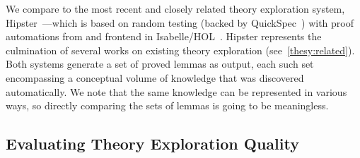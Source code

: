 \begin{comment} 
The better known but opposed approach is the common SMT solver approach (Barrett et al., Gil et al.). In the SMT approach, the solver attempts to search for a legal valuation, and assumptions are made freely. This leads to a cheap splitting mechanism, but with an expensive backtracking algorithm. We evaluated our case splitting mechanism by applying TheSy to Clam’s (Claessen et al.) theory-proving dataset with three configurations: no case splitting - default implementation; half case splitting – splitting was applied only during proof search; and full  case splitting – splitting was applied for both exploration and proof search. Each test case was limited to 15 minutes and 16 GB RAM, and the results are shown in Table 1. Additionally, we report the number of lemmas found in the full configuration compared to the half configuration and the number of proofs filtered in each configuration. An interesting point is that the no and full configurations had 53 and 54 goals proved, respectively. This difference is due to full configuration time-outing during case splitting in which regular exploration is sufficient. Using the half configuration, TheSy proved 61 goals which mostly overlap with the previous configurations as it is less prune to time-outs. In total, TheSy proved 63 out of the 85 goals. Memory and time limits lead to most of the full case splitting failures. Case splitting during exploration led to additional conjectures and lemmas; many conjectures were filtered only after proving their correctness, a phenomenon which impaired the conjecture generation/screening process. This happened because TheSy’s e-graph size is limited for memory concerns, resulting in an unsound screening process .
\end{comment}

We compare \TheSy to the most recent and closely related theory exploration system, Hipster~\cite{hipster}---which is
based on random testing (backed by QuickSpec~\cite{JFP2017:Smallbonequickspec2}) with proof automations from and frontend in Isabelle/HOL~\cite{Book2002:Nipkow}.
Hipster represents the culmination of several works on existing theory exploration (see~\autoref{thesy:related}).
Both systems generate a set of proved lemmas as output, each such set encompassing a conceptual volume of knowledge that was discovered automatically.
We note that the same knowledge can be represented in various ways, so directly comparing the sets of lemmas is going to be meaningless.

\subsection{Evaluating Theory Exploration Quality}


